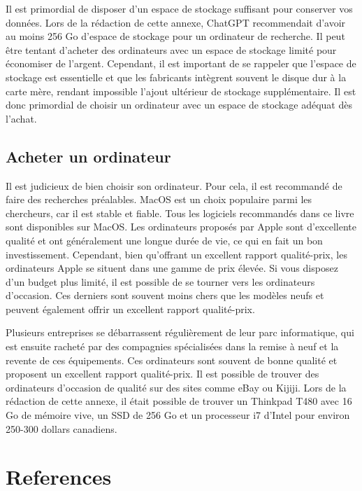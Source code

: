 \documentclass[
  letterpaper,
  DIV=11,
  numbers=noendperiod]{scrreprt}
\begin{document}
Il est primordial de disposer d'un espace de stockage suffisant pour
conserver vos données. Lors de la rédaction de cette annexe, ChatGPT
recommendait d'avoir au moins 256 Go d'espace de stockage pour un
ordinateur de recherche. Il peut être tentant d'acheter des ordinateurs
avec un espace de stockage limité pour économiser de l'argent.
Cependant, il est important de se rappeler que l'espace de stockage est
essentielle et que les fabricants intègrent souvent le disque dur à la
carte mère, rendant impossible l'ajout ultérieur de stockage
supplémentaire. Il est donc primordial de choisir un ordinateur avec un
espace de stockage adéquat dès l'achat.

\hypertarget{acheter-un-ordinateur}{%
\section{Acheter un ordinateur}\label{acheter-un-ordinateur}}

Il est judicieux de bien choisir son ordinateur. Pour cela, il est
recommandé de faire des recherches préalables. MacOS est un choix
populaire parmi les chercheurs, car il est stable et fiable. Tous les
logiciels recommandés dans ce livre sont disponibles sur MacOS. Les
ordinateurs proposés par Apple sont d'excellente qualité et ont
généralement une longue durée de vie, ce qui en fait un bon
investissement. Cependant, bien qu'offrant un excellent rapport
qualité-prix, les ordinateurs Apple se situent dans une gamme de prix
élevée. Si vous disposez d'un budget plus limité, il est possible de se
tourner vers les ordinateurs d'occasion. Ces derniers sont souvent moins
chers que les modèles neufs et peuvent également offrir un excellent
rapport qualité-prix.

Plusieurs entreprises se débarrassent régulièrement de leur parc
informatique, qui est ensuite racheté par des compagnies spécialisées
dans la remise à neuf et la revente de ces équipements. Ces ordinateurs
sont souvent de bonne qualité et proposent un excellent rapport
qualité-prix. Il est possible de trouver des ordinateurs d'occasion de
qualité sur des sites comme eBay ou Kijiji. Lors de la rédaction de
cette annexe, il était possible de trouver un Thinkpad T480 avec 16 Go
de mémoire vive, un SSD de 256 Go et un processeur i7 d'Intel pour
environ 250-300 dollars canadiens.


\hypertarget{references}{%
\chapter*{References}\label{references}}
\end{document}
